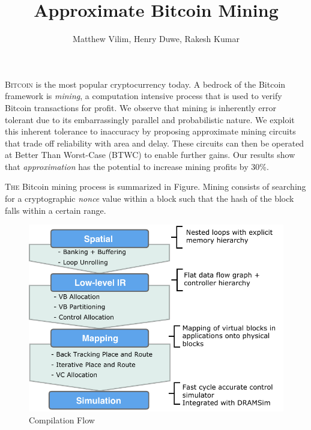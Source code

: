 \documentclass[portrait,a0,final]{a0poster}
\begin{document}
\setlength{\columnsep}{50pt}

\title{\veryHuge Approximate Bitcoin Mining}
\author{\Large Matthew Vilim, Henry Duwe, Rakesh Kumar}
\date{}
\maketitle

\begin{multicols}{3}

\begin{tcolorbox}[title=Abstract]
\lettrine{B}{itcoin} is the most popular cryptocurrency today. A bedrock of the Bitcoin framework is \emph{mining}, a computation intensive process that is used to verify Bitcoin transactions for profit. We observe that mining is inherently error tolerant due to its embarrassingly parallel and probabilistic nature. We exploit this inherent tolerance to inaccuracy by proposing approximate mining circuits that trade off reliability with area and delay. These circuits can then be operated at Better Than Worst-Case (BTWC) to enable further gains. Our results show that \emph{approximation} has the potential to increase mining profits by 30\%.
\end{tcolorbox}

\begin{tcolorbox}[title=Mining Background]
\lettrine{T}{he} Bitcoin mining process is summarized in Figure. Mining consists of searching for a cryptographic \emph{nonce} value within a block such that the hash of the block falls within a certain range.
\end{tcolorbox}

\begin{figure}[H]
\caption{Compilation Flow}
\label{fig:flow}
\centering
\includegraphics[width=1\linewidth]{figs/flow.pdf}
\end{figure}


\end{multicols}
\end{document}

